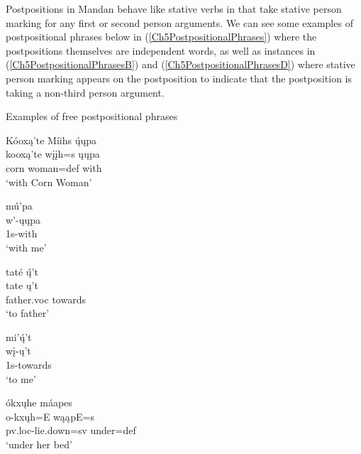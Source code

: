 Postpositions in Mandan behave like stative verbs in that take stative person marking for any first or second person arguments. 
We can see some examples of postpositional phrases below in (\ref{Ch5PostpositionalPhrases}) where the postpositions themselves are independent words, as well as instances in (\ref{Ch5PostpositionalPhrasesB}) and (\ref{Ch5PostpositionalPhrasesD}) where stative person marking appears on the postposition to indicate that the postposition is taking a non-third person argument.

\begin{exe}
    \item\label{Ch5PostpositionalPhrases} Examples of free postpositional phrases

    \begin{xlist}
        \item\label{Ch5PostpositionalPhrasesA} \glll Kóoxą’te Míihs ų́ųpa\\
        kooxą'te wįįh=s ųųpa\\
        \textnormal{corn} \textnormal{woman}=def \textnormal{with}\\
        \glt `with Corn Woman' \citep[112]{hollow1973a}

        \item\label{Ch5PostpositionalPhrasesB}
        \glll mú'pa\\
        w'-ųųpa\\
        1s-\textnormal{with}\\
        \glt `with me' \citep[284]{hollow1973b}

        \item\label{Ch5PostpositionalPhrasesC}
        \glll taté ų́'t\\
        tate ų't\\
        \textnormal{father}.voc \textnormal{towards}\\
        \glt `to father' \citep[25]{kennard1936}

        \item\label{Ch5PostpositionalPhrasesD}
        \glll mi'ų́'t\\
        wį-ų't\\
        1s-\textnormal{towards}\\
        \glt `to me' \citep[122]{hollow1973b}

        \item\label{Ch5PostpositionalPhrasesE} \glll ókxųhe máapes\\
        o-kxųh=E wąąpE=s\\
        pv.loc-\textnormal{lie.down}=sv \textnormal{under}=def\\
        \glt `under her bed' \citep[321]{hollow1973b}

    \end{xlist}

\end{exe}

